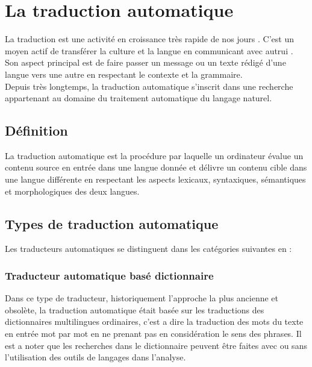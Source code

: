 \section{La traduction automatique}
La traduction est une activité en croissance très rapide de nos jours \cite{tradstat}. C'est un moyen actif de transférer la culture et la langue en communicant avec autrui \cite{tradcom}. Son aspect principal est de faire passer un message ou un texte rédigé d'une langue vers une autre en respectant le contexte et la grammaire.\\
Depuis très longtemps, la traduction automatique s'inscrit dans une recherche appartenant au domaine du traitement automatique du langage naturel.
    \subsection{Définition}
    La traduction automatique est la procédure par laquelle un ordinateur évalue un contenu source en entrée dans une langue donnée et délivre un contenu cible dans une langue différente en respectant les aspects lexicaux, syntaxiques, sémantiques et morphologiques des deux langues.
    \subsection{Types de traduction automatique}
    Les traducteurs automatiques se distinguent dans les catégories suivantes en :
        \subsubsection{Traducteur automatique basé dictionnaire}
        Dans ce type de traducteur, historiquement l'approche la plus ancienne et obsolète, la traduction automatique était basée sur les traductions des dictionnaires multilingues ordinaires, c'est a dire la traduction des mots du texte en entrée mot par mot en ne prenant pas en considération le sens des phrases. Il est a noter que les recherches dans le dictionnaire peuvent être faites avec ou sans l'utilisation des outils de langages dans l'analyse.
